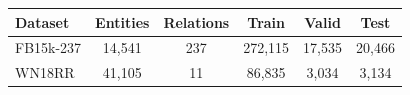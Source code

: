 \begin{tabular}{lccccc}
\toprule
\textbf{Dataset} & \textbf{Entities} & \textbf{Relations} & \textbf{Train} & \textbf{Valid} & \textbf{Test} \\
\midrule
FB15k-237 & 14{,}541 & 237 & 272{,}115 & 17{,}535 & 20{,}466 \\
WN18RR & 41{,}105 & 11 & 86{,}835 & 3{,}034 & 3{,}134 \\
\bottomrule
\end{tabular}
